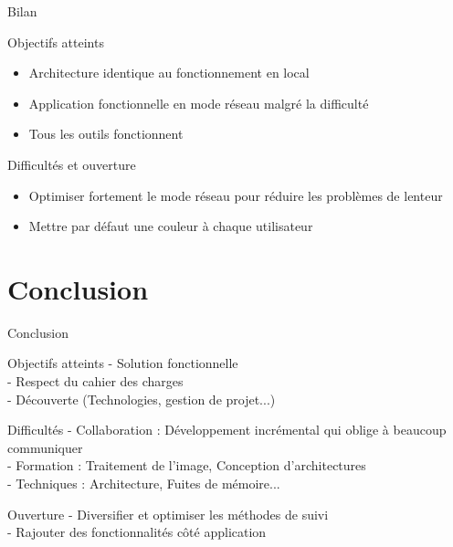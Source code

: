 \documentclass{beamer}
\begin{document}
		\begin{frame}{Bilan}
			\begin{exampleblock}{Objectifs atteints}
				\begin{itemize}
				\item Architecture identique au fonctionnement en local
				\item Application fonctionnelle en mode réseau malgré la difficulté
				\item Tous les outils fonctionnent
				\end{itemize}
			\end{exampleblock}
			\pause
			\begin{alertblock}{Difficultés et ouverture}
				\begin{itemize}
				\item Optimiser fortement le mode réseau pour réduire les problèmes de lenteur
				\item Mettre par défaut une couleur à chaque utilisateur
				\end{itemize}
			\end{alertblock}
		\end{frame}

	\section{Conclusion}
		\begin{frame}{Conclusion}
			\begin{exampleblock}{Objectifs atteints}
				- Solution fonctionnelle \\
				- Respect du cahier des charges \\
				- Découverte (Technologies, gestion de projet...) \\ 
			\end{exampleblock}
			\pause
			\begin{alertblock}{Difficultés}
				- Collaboration : Développement incrémental qui oblige à beaucoup communiquer \\
				- Formation : Traitement de l'image, Conception d'architectures \\
				- Techniques : Architecture, Fuites de mémoire...\\
			\end{alertblock}
			\pause
			\begin{block}{Ouverture}
				- Diversifier et optimiser les méthodes de suivi \\
				- Rajouter des fonctionnalités côté application \\
			\end{block}
		\end{frame}
	
\end{document}
